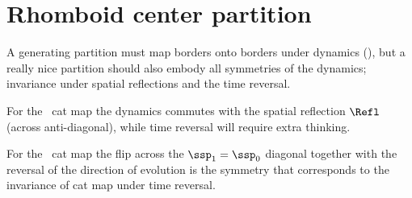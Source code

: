 \section{Rhomboid center partition}
\label{sect:RhombCenter}

A generating partition must map borders onto borders under dynamics
(\AW),
but a really nice partition should also embody all
symmetries of the dynamics; invariance under spatial reflections and the
time reversal.

For the \PV\ cat map the  dynamics commutes with the spatial
reflection $\Refl$ (across anti-diagonal), while time reversal will
require extra thinking.

For the \PV\ cat map the flip across the $\ssp_1=\ssp_0$
diagonal together with the reversal of the direction of evolution is the
 symmetry that corresponds to the invariance of cat map under time
reversal.


